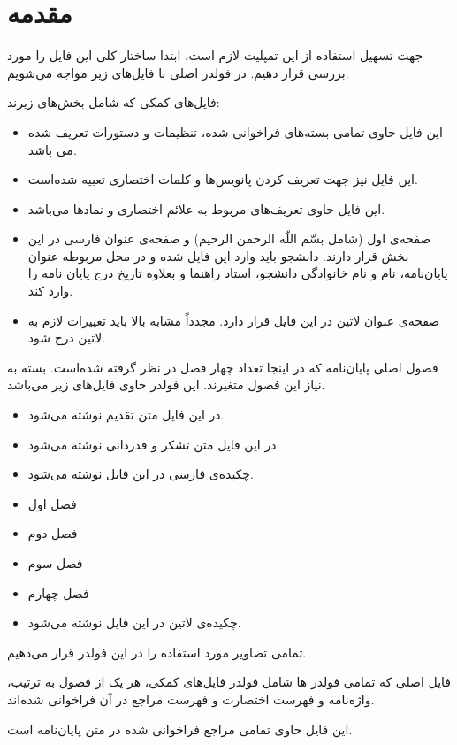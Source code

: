 \chapter{مقدمه}
جهت تسهیل استفاده از این تمپلیت لازم است، ابتدا ساختار کلی این فایل را مورد بررسی قرار دهیم. در فولدر اصلی با فایل‌های زیر مواجه می‌شویم. 
\begin{contract}
	\item \textbf{}
	فایل‌های کمکی که شامل بخش‌های زیرند: 
	\begin{itemize}
		\item \textbf{}
		این فایل حاوی تمامی بسته‌های فراخوانی شده، تنظیمات و دستورات تعریف شده می باشد. 
		\item \textbf{}
		این فایل نیز جهت تعریف کردن پانویس‌ها و کلمات اختصاری تعبیه شده‌است. 
		\item \textbf{}
		این فایل حاوی تعریف‌های مربوط به علائم اختصاری و نماد‌ها می‌باشد. 
		\item \textbf{} 
		صفحه‌ی اول (شامل بسّم اللّه الرحمن الرحیم) و صفحه‌ی عنوان فارسی در این بخش قرار دارند. دانشجو باید وارد این فایل شده و در محل مربوطه عنوان پایان‌نامه، نام و نام خانوادگی دانشجو، استاد راهنما و بعلاوه تاریخ درج پایان نامه را وارد کند. 
		\item  \textbf{}
		صفحه‌ی عنوان لاتین در این فایل قرار دارد. مجدداً مشابه بالا باید تغییرات لازم به لاتین درج شود. 
	\end{itemize}
	\item \textbf{ }
	فصول اصلی پایان‌نامه که در اینجا تعداد چهار فصل در نظر گرفته شده‌است. بسته به نیاز این فصول متغیرند. این فولدر حاوی فایل‌های زیر می‌باشد. 
	\begin{itemize}
		\item \textbf{} 
		در این فایل متن تقدیم نوشته می‌شود. 
		\item \textbf{} 
		در این فایل متن تشکر و قدردانی نوشته می‌شود. 
		\item \textbf{} 
		چکیده‌ی فارسی در این فایل نوشته می‌شود. 
		\item \textbf{} 
		فصل اول
		\item \textbf{} 
		فصل دوم
		\item \textbf{} 
		فصل سوم
		\item \textbf{} 
		فصل چهارم 
		\item \textbf{}
		چکیده‌ی لاتین در این فایل نوشته می‌شود. 
	\end{itemize}
	\item \textbf{}
	تمامی تصاویر مورد استفاده را در این فولدر قرار می‌دهیم. 
	\item \textbf{}
	 فایل اصلی که تمامی فولدر ها شامل فولدر فایل‌های کمکی، هر یک از فصول به ترتیب، واژه‌نامه و فهرست اختصارت و فهرست مراجع در آن فراخوانی شده‌اند. 
	\item \textbf{}
	این فایل حاوی تمامی مراجع فراخوانی شده در متن پایان‌نامه است. 
\end{contract}

